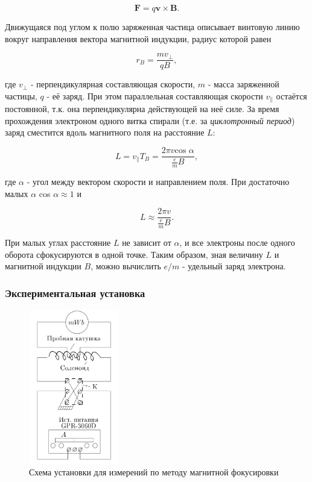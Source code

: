 \documentclass[a4paper,12pt]{article} %
\begin{document}
\begin{equation}
    \mathbf{F} = q\mathbf{v}\times\mathbf{B}.
\end{equation}

Движущаяся под углом к полю заряженная частица описывает винтовую линию вокруг направления вектора магнитной индукции, радиус которой равен

\begin{equation}
    r_B = \frac{mv_\bot}{qB}, 
\end{equation}

где $v_\bot$ - перпендикулярная составляющая скорости, $m$ - масса заряженной частицы, $q$ - её заряд. При этом параллельная составляющая скорости $v_\parallel$ остаётся постоянной, т.к. она перпендикулярна действующей на неё силе. За время прохождения электроном одного витка спирали (т.е. за \textit{циклотронный период}) заряд сместится вдоль магнитного поля на расстояние $L$:

\begin{equation}
    L = v_\parallel T_B = \frac{2\pi v \text{cos }\alpha}{\frac{e}{m}B},
\end{equation}

где $\alpha$ - угол между вектором скорости и направлением поля. При достаточно малых $\alpha$ cos $\alpha \approx 1$ и

\begin{equation}
    L \approx \frac{2\pi v}{\frac{e}{m}B}.
    \label{spiralStep}
\end{equation}

При малых углах расстояние $L$ не зависит от $\alpha$, и все электроны после одного оборота сфокусируются в одной точке. Таким образом, зная величину $L$ и магнитной индукции $B$, можно вычислить $e/m$ - удельный заряд электрона.

\subsubsection{Экспериментальная установка}

\begin{figure}
    \centering
    \includegraphics[width = 0.35\textwidth]{setupA.png}
    \caption{Схема установки для измерений по методу магнитной фокусировки}
    \label{fig:setupA}
\end{figure}
\end{document}
